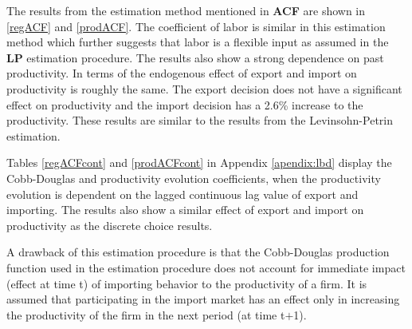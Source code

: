 \documentclass[12pt]{article}
\begin{document}
The results from the estimation method mentioned in
 \textbf{ACF} are shown in \ref{regACF} and \ref{prodACF}. The coefficient of labor is similar in this
estimation method which further suggests that labor is a flexible
input as assumed in the \textbf{LP} estimation procedure. The results also
show a strong dependence on past productivity. In terms of the endogenous effect
of export and import on productivity is roughly the same. The export
decision does not have a significant effect on productivity and the
import decision has a 2.6\% increase to the productivity. These
results are similar to the results from the Levinsohn-Petrin
estimation.   %
 
 




Tables \ref{regACFcont} and \ref{prodACFcont} in Appendix \ref{apendix:lbd}  display the Cobb-Douglas and
productivity evolution
coefficients,  when the
productivity evolution is dependent on the lagged continuous lag value of
export and importing. The results also show a similar effect of export
and import on productivity as the discrete choice results.  

A drawback of this estimation procedure is that 
the Cobb-Douglas production function used in the estimation procedure  does not
account for immediate impact (effect at time t) of 
importing behavior to the productivity of a firm.  It is assumed that
participating in the import market has an effect only in increasing the
productivity of the firm in the next period (at time t$+$1). 

\end{document}
